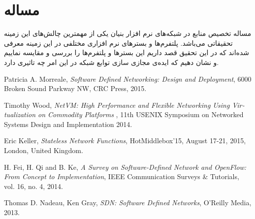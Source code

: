 ﻿\documentclass[11pt]{article}
\begin{document}
\section*{مساله}
	مساله تخصیص منابع در شبکه‌های نرم افزار بنیان یکی از مهمترین چالش‌های این زمینه تحقیقاتی می‌باشد. پلتفرم‌ها و بستر‌های نرم افزاری مختلفی در این زمینه معرفی شده‌اند که در این تحقیق قصد داریم این بستر‌ها و پلتفرم‌ها را بررسی و مقایسه نماییم و نشان دهیم که ایده‌ی مجازی سازی توابع شبکه در این امر چه تاثیری دارد. 
\begin{thebibliography}{9}
	\begin{latin}
		Patricia A. Morreale,
		\emph{Software Defined Networking: Design and Deployment},
		6000 Broken Sound Parkway NW,
		CRC Press,
		2015.
	\end{latin}
	\begin{latin}
		Timothy Wood,
		\emph{NetVM: High Performance and Flexible Networking
Using Virtualization on Commodity Platforms },
		11th USENIX Symposium on Networked Systems Design and Implementation
  		2014.
	\end{latin}
	\begin{latin}
		Eric Keller,
		\emph{Stateless Network Functions},
		HotMiddlebox’15, August 17-21, 2015, London, United Kingdom.
	\end{latin}
	\begin{latin}
		H. Fei, H. Qi and B. Ke,
		\emph{A Survey on Software-Defined Network and OpenFlow: From Concept to Implementation},
		IEEE Communication Surveys \& Tutorials, vol. 16, no. 4,
 		2014.
	\end{latin}
	\begin{latin}
		Thomas D. Nadeau, Ken Gray,
		\emph{SDN: Software Defined Networks},
		O'Reilly Media,
		2013.
	\end{latin}


\end{thebibliography}
\end{document}
